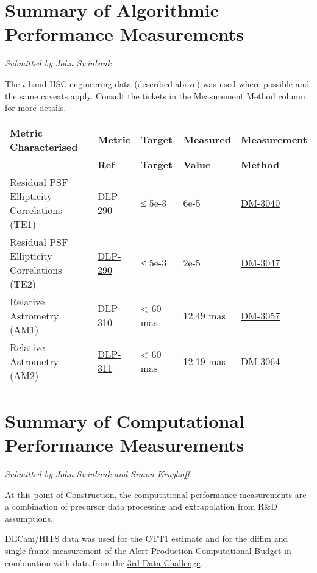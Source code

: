 \documentclass[DM,toc,lsstdraft]{lsstdoc}
\begin{document}
\section{Summary of Algorithmic Performance
Measurements}\label{summary-of-algorithmic-performance-measurements}

\emph{Submitted by John Swinbank}

The $i$-band HSC engineering data (described above) was used where
possible and the same caveats apply. Consult the tickets in the
Measurement Method column for more details.

\begin{small}
\begin{longtable}[]{@{}lllll@{}}
\toprule
\textbf{Metric Characterised} & \textbf{Metric} & \textbf{Target} &
\textbf{Measured} & \textbf{Measurement}\tabularnewline
 & \textbf{Ref} & \textbf{Target} &
\textbf{Value} & \textbf{Method}\tabularnewline
\midrule
\endhead
Residual PSF Ellipticity Correlations (TE1) &
\href{https://jira.lsstcorp.org/browse/DLP-290}{DLP-290} & ≤ 5e-3 & 6e-5
&
\href{https://jira.lsstcorp.org/browse/DM-3040}{DM-3040}\tabularnewline
Residual PSF Ellipticity Correlations (TE2) &
\href{https://jira.lsstcorp.org/browse/DLP-290}{DLP-290} & ≤ 5e-3 & 2e-5
& \href{https://jira.lsstcorp.org/browse/DM-3047}{DM-3047
}\tabularnewline
Relative Astrometry (AM1) &
\href{https://jira.lsstcorp.org/browse/DLP-310}{DLP-310} & \textless{}
60 mas & 12.49 mas &
\href{https://jira.lsstcorp.org/browse/DM-3057}{DM-3057}\tabularnewline
Relative Astrometry (AM2) &
\href{https://jira.lsstcorp.org/browse/DLP-311}{DLP-311} & \textless{}
60 mas & 12.19 mas &
\href{https://jira.lsstcorp.org/browse/DM-3064}{DM-3064}\tabularnewline
\bottomrule
\end{longtable}
\end{small}

\section{Summary of Computational Performance
Measurements}\label{summary-of-computational-performance-measurements}

\emph{Submitted by John Swinbank and
Simon Krughoff}

At this point of Construction, the computational performance
measurements are a combination of precursor data processing and
extrapolation from R\&D assumptions.

DECam/HITS data was used for the OTT1 estimate and for the diffim and
single-frame measurement of the Alert Production Computational Budget in
combination with data from the
\href{https://dev.lsstcorp.org/trac/wiki/DC3bPT1_1}{3rd Data Challenge}.
\end{document}
